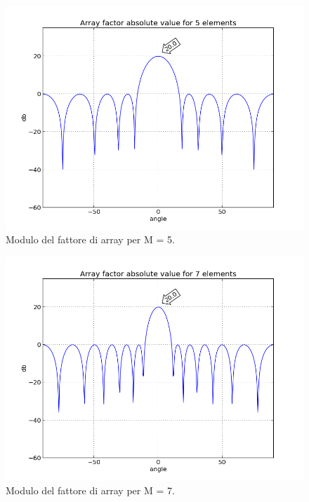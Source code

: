\begin{figure}
\centering
\caption{Modulo del fattore di array per M = 5.}
\label{img:module5}
\includegraphics[scale=0.5]{Immagini/module5}
\end{figure}
\begin{figure}
\centering
\caption{Modulo del fattore di array per M = 7.}
\label{img:module7}
\includegraphics[scale=0.5]{Immagini/module7}
\end{figure}
